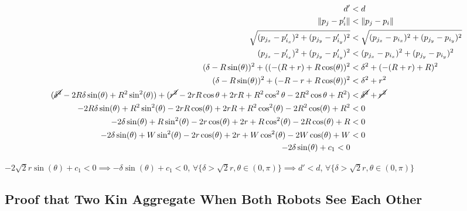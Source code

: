 \documentclass[conference]{IEEEtran}
\begin{document}
    \begin{align*}
      d' &< d \\
      \lVert p_j - p'_i \rVert &< \lVert p_j - p_i \rVert \\
      \sqrt{(p_{j_x} - p'_{i_x})^2 + (p_{j_y} - p'_{i_y})^2} &< \sqrt{(p_{j_x} - p_{i_x})^2 + (p_{j_y} - p_{i_y})^2} \\
      (p_{j_x} - p'_{i_x})^2 + (p_{j_y} - p'_{i_y})^2 &< (p_{j_x} - p_{i_x})^2 + (p_{j_y} - p_{i_y})^2 \\
      (\delta - R\sin(\theta))^2 + ((-(R+r) + R\cos(\theta))^2 &< \delta^2 + (-(R+r) + R)^2 \\
      (\delta - R\sin(\theta))^2 + (-R-r+R\cos(\theta))^2 &< \delta^2 + r^2 \\
      (\cancel{\delta^2} - 2R\delta\sin(\theta) + R^2\sin^2(\theta)) + (\cancel{r^2}-2rR\cos{\theta}+2rR+R^2\cos^2{\theta}-2R^2\cos{\theta}+R^2) &< \cancel{\delta^2} + \cancel{r^2} \\
      -2R\delta\sin(\theta) + R^2\sin^2(\theta) - 2rR\cos(\theta)+2rR+R^2\cos^2(\theta)- 2R^2\cos(\theta) + R^2 &< 0 \\
      -2\delta\sin(\theta) + R\sin^2(\theta) - 2r\cos(\theta)+2r+R\cos^2(\theta)- 2R\cos(\theta) + R &< 0 \\
      -2\delta\sin(\theta) + W\sin^2(\theta) - 2r\cos(\theta)+2r+W\cos^2(\theta)- 2W\cos(\theta) + W &< 0 \\
      -2\delta\sin(\theta) + c_1 < 0
    \end{align*}

    $-2\sqrt{2}r\sin(\theta) + c_1<0 \implies -\delta\sin(\theta) + c_1<0$, $\forall \{\delta > \sqrt{2}r, \theta\in(0,\pi)\} \implies d'<d$, $\forall \{\delta > \sqrt{2}r, \theta\in(0,\pi)\}$


  \subsection{Proof that Two Kin Aggregate When Both Robots See Each Other} \label{thm:two_agg_2}
\end{document}
